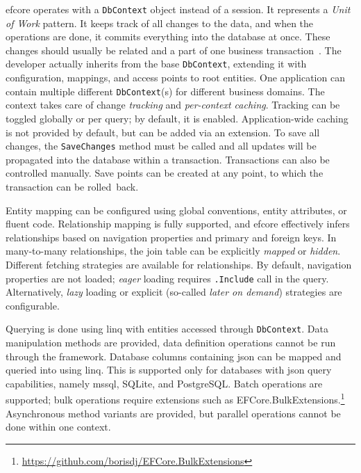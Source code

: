 \acrshort{efcore} operates with a \texttt{DbContext} object instead of a session. It represents a \textit{Unit of Work} pattern. It keeps track of all changes to the data, and when the operations are done, it commits everything into the database at once. These changes should usually be related and a part of one business transaction~\cite{FowlerUOW}. The developer actually inherits from the base \texttt{DbContext}, extending it with configuration, mappings, and access points to root entities. One application can contain multiple different \texttt{DbContext}(s) for different business domains. The context takes care of change \textit{tracking} and \textit{per-context caching}. Tracking can be toggled globally or per query; by default, it is enabled. Application-wide caching is not provided by default, but can be added via an extension. To save all changes, the \texttt{SaveChanges} method must be called and all updates will be propagated into the database within a transaction. Transactions can also be controlled manually. Save points can be created at any point, to which the transaction can be rolled~back.

Entity mapping can be configured using global conventions, entity attributes, or fluent code. Relationship mapping is fully supported, and \acrshort{efcore} effectively infers relationships based on navigation properties and primary and foreign keys. In many-to-many relationships, the join table can be explicitly \textit{mapped} or \textit{hidden}. Different fetching strategies are available for relationships. By default, navigation properties are not loaded; \textit{eager} loading requires \texttt{.Include} call in the query. Alternatively, \textit{lazy} loading or explicit (so-called \textit{later on demand}) strategies are configurable. 

Querying is done using \acrshort{linq} with entities accessed through \texttt{DbContext}. Data manipulation methods are provided, data definition operations cannot be run through the framework. Database columns containing \acrshort{json} can be mapped and queried into using \acrshort{linq}. This is supported only for databases with \acrshort{json} query capabilities, namely \acrshort{mssql}, SQLite, and PostgreSQL. Batch operations are supported; bulk operations require extensions such as EFCore.BulkExtensions.\footnote{\url{https://github.com/borisdj/EFCore.BulkExtensions}} Asynchronous method variants are provided, but parallel operations cannot be done within one context.

